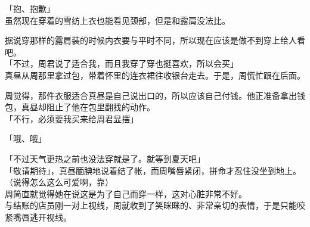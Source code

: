 「抱、抱歉」\\

虽然现在穿着的雪纺上衣也能看见颈部，但是和露肩没法比。

据说穿那样的露肩装的时候内衣要与平时不同，所以现在应该是做不到穿上给人看吧。\\

「不过，周君说了适合我，而且我穿了穿也挺喜欢，所以会买」\\

真昼从周那里拿过包，带着怀里的连衣裙往收银台走去。于是，周慌忙跟在后面。

周觉得，那件衣服适合真昼是自己说出口的，所以应该自己付钱。他正准备拿出钱包，真昼却阻止了他在包里翻找的动作。\\

「不行，必须要我买来给周君显摆」

「哦、哦」

「不过天气更热之前也没法穿就是了。就等到夏天吧」\\

「敬请期待」，真昼腼腆地说着结了帐，而周嘴唇紧闭，拼命才忍住没坐到地上。\\

（说得怎么这么可爱啊，靠）\\

周简直就觉得她在说这是为了自己而穿一样，这对心脏非常不好。\\

与结账的店员刚一对上视线，周就收到了笑眯眯的、非常亲切的表情，于是只能咬紧嘴唇逃开视线。
